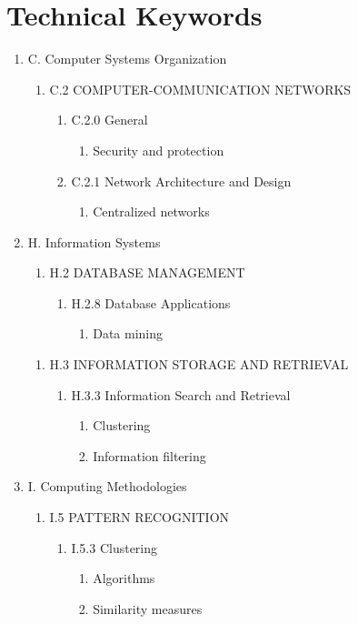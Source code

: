 \documentclass[12pt,a4paper,final]{report}
\begin{document}
\section{Technical Keywords}
\begin{enumerate}
\item C. Computer Systems Organization 
\begin{enumerate}
\item C.2 COMPUTER-COMMUNICATION NETWORKS 
\begin{enumerate}
\item C.2.0 General  
\begin{enumerate}
\item  Security and protection
\end{enumerate} 
\item C.2.1 Network Architecture and Design
\begin{enumerate}
\item  Centralized networks
\end{enumerate} 
\end{enumerate} 
\end{enumerate}
	
\item H. Information Systems  
\begin{enumerate}
\item H.2 DATABASE MANAGEMENT
\begin{enumerate}		
\item H.2.8 Database Applications   
\begin{enumerate}
\item  Data mining
\end{enumerate} 	 		
\end{enumerate} 
\end{enumerate}	

\begin{enumerate}
\item H.3 INFORMATION STORAGE AND RETRIEVAL 
\begin{enumerate}		
\item H.3.3 Information Search and Retrieval  
\begin{enumerate}
\item  Clustering
\item Information filtering
\end{enumerate} 
\end{enumerate} 
\end{enumerate}
	
\item I. Computing Methodologies  
\begin{enumerate}
\item I.5 PATTERN RECOGNITION 
\begin{enumerate}		
\item I.5.3 Clustering   
\begin{enumerate}
\item Algorithms
\item Similarity measures 
\end{enumerate} 
\end{enumerate} 
\end{enumerate}		
\end{enumerate}
\end{document}
